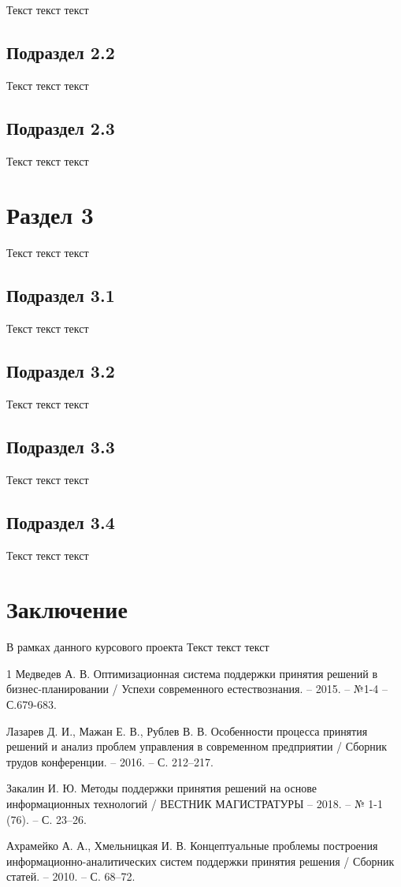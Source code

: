 \documentclass[utf8, russian]{eskdtext}
\let\stdsection\section
\renewcommand \section{\newpage\stdsection}
\begin{document}
Текст текст текст

\subsection{Подраздел 2.2}

Текст текст текст

\subsection{Подраздел 2.3}

Текст текст текст

\section{Раздел 3}
Текст текст текст

\subsection{Подраздел 3.1}

Текст текст текст

\subsection{Подраздел 3.2}

Текст текст текст

\subsection{Подраздел 3.3}

Текст текст текст

\subsection{Подраздел 3.4}

Текст текст текст

\section*{Заключение}
В рамках данного курсового проекта Текст текст текст

\begin{thebibliography}{1}
    Медведев А. В. Оптимизационная система поддержки принятия
решений в бизнес-планировании / Успехи современного естествознания.
– 2015. – №1-4 – С.679-683.

     Лазарев Д. И., Мажан Е. В., Рублев В. В. Особенности процесса принятия решений и анализ проблем управления в современном предприятии / Сборник трудов конференции. – 2016. – С. 212–217.

     Закалин И. Ю. Методы поддержки принятия решений на основе информационных технологий / ВЕСТНИК МАГИСТРАТУРЫ  – 2018. – № 1-1 (76). – С. 23–26.

     Ахрамейко А. А., Хмельницкая И. В. Концептуальные проблемы построения информационно-аналитических систем поддержки принятия решения / Сборник статей. – 2010. – С. 68–72.
\end{thebibliography}
\end{document}
